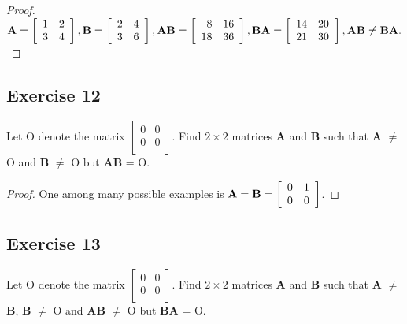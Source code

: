 \documentclass[14pt]{extarticle}
\begin{document}
\begin{proof}
    \({\bf A} =
    \left[
        \begin{array}{rr}
            1 & 2 \\
            3 & 4 \\
        \end{array}
        \right], {\bf B} =
    \left[
        \begin{array}{rr}
            2 & 4 \\
            3 & 6 \\
        \end{array}
        \right], {\bf AB} =
    \left[
        \begin{array}{rr}
            8  & 16 \\
            18 & 36 \\
        \end{array}
        \right], {\bf BA} =
    \left[
        \begin{array}{rr}
            14 & 20 \\
            21 & 30 \\
        \end{array}
        \right], {\bf AB} \neq {\bf BA}.
    \)
\end{proof}

\subsection{Exercise 12}
Let O denote the matrix
\(\left[
    \begin{array}{rr}
        0 & 0 \\
        0 & 0 \\
    \end{array}
    \right]
\). Find \(2 \times 2\) matrices {\bf A} and {\bf B} such that {\bf A} \(\neq\) O and {\bf B} \(\neq\) O but {\bf AB} = O.

\begin{proof}
    One among many possible examples is
    \({\bf A} = {\bf B} =
    \left[
        \begin{array}{rr}
            0 & 1 \\
            0 & 0 \\
        \end{array}
        \right]
    \).
\end{proof}

\subsection{Exercise 13}
Let O denote the matrix
\(\left[
    \begin{array}{rr}
        0 & 0 \\
        0 & 0 \\
    \end{array}
    \right]
\). Find \(2 \times 2\) matrices {\bf A} and {\bf B} such that {\bf A} \(\neq\) {\bf B}, {\bf B} \(\neq\) O and {\bf AB} \(\neq\) O but
    {\bf BA} = O.
\end{document}
